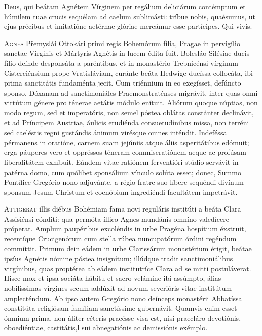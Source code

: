 \begin{caputFesti}
\end{caputFesti}

\parsOratio

Deus, qui beátam Agnétem Vírginem
per regálium deliciárum contémptum
et húmilem tuae crucis sequélam
ad caelum sublimásti:
tríbue nobis, quaésumus,
ut ejus précibus et imitatióne
aetérnae glóriae mereámur esse partícipes.
Qui vivis.

\horaNocturnusII


\lettrine{A}{gnes} Přemyslái Ottokári primi regis Bohemórum fília,
Pragae in pervigílio sanctae Vírginis et Mártyris Agnétis
in lucem édita fuit.
Bolesláo Silésiae ducis fílio deínde desponsáta a paréntibus,
et in monastério Trebnicénsi vírginum Cisterciénsium
prope Vratisláviam,
curánte beáta Hedwíge ducíssa collocáta,
ibi prima sanctitátis fundaménta jecit.
Cum triénnium in eo exegísset, defúncto sponso,
Dóxanam ad sanctimoniáles Praemonstraténses migrávit,
inter quas omni virtútum génere pro ténerae aetátis módulo enítuit.
Aliórum quoque núptias, non modo regum, sed et imperatóris,
non semel póstea oblátas constánter declinávit,
et ad Príncipem Austriae, áulicis erudiénda consuetudínibus missa,
non terréni sed caeléstis regni gustándis ánimum virésque omnes inténdit.
Indeféssa pérmanens in oratióne,
carnem suam jejúniis atque áliis asperitátibus edómuit;
erga páuperes vero et oppréssos téneram commiseratiónem aeque
ac profúsam liberalitátem exhíbuit.
Eándem vitae ratiónem ferventióri stúdio servávit in patérna domo,
cum quólibet sponsálium vínculo solúta esset;
donec, Summo Pontífice Gregório nono adjuvánte,
a régio fratre suo líbere sequéndi divínum sponsum Jesum Christum
et coenóbium ingrediéndi facultátem impetrávit.



\lettrine{A}{ttígerat} illis diébus Bohémiam fama novi reguláris
institúti a beáta Clara Assisiénsi cónditi:
qua permóta íllico Agnes mundánis omníno valedícere próperat.
Amplum paupéribus excoléndis in urbe Pragéna hospítium éxstruit,
recentíque Crucigenórum cum stella rúbea nuncupatórum órdini
regéndum commíttit.
Primum dein eádem in urbe Clarissárum monastérium érigit,
beátae ipsíus Agnétis nómine póstea insignítum;
illúdque tradit sanctimoniálibus virgínibus,
quas proptérea ab eádem institutríce Clara ad se mitti postuláverat.
Hisce mox et ipsa sociáta hábitu et sacro velámine ibi assúmpto,
álias nobilíssimas vírgines secum addúxit
ad novum severióris vitae institútum amplecténdum.
Ab ipso autem Gregório nono deínceps monastérii Abbatíssa constitúta
religiósam famíliam sanctíssime gubernávit.
Quamvis enim esset ómnium prima,
non áliter céteris praeésse visa est,
nisi praecláro devotiónis, oboediéntiae, castitátis,l
sui abnegatiónis ac demissiónis exémplo.

